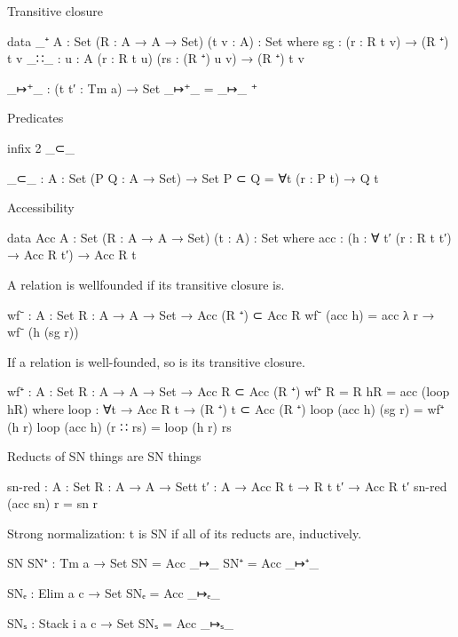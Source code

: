 Transitive closure


\begin{code}
data _⁺ {A : Set} (R : A → A → Set) (t v : A) : Set where
  sg   : (r : R t v) → (R ⁺) t v
  _∷_  : {u : A} (r : R t u) (rs : (R ⁺) u v) → (R ⁺) t v

_↦⁺_ : (t t′ : Tm a) → Set
_↦⁺_ = _↦_ ⁺
\end{code}


Predicates

\begin{code}
infix 2 _⊂_

_⊂_ : {A : Set} (P Q : A → Set) → Set
P ⊂ Q = ∀{t} (r : P t) → Q t
\end{code}

Accessibility

\begin{code}
data Acc {A : Set} (R : A → A → Set) (t : A) : Set where
  acc : (h : ∀ {t′} (r : R t t′) → Acc R t′) → Acc R t
\end{code}

A relation is wellfounded if its transitive closure is.

\begin{code}
wf⁻ : {A : Set} {R : A → A → Set} → Acc (R ⁺) ⊂ Acc R
wf⁻ (acc h) = acc λ r → wf⁻ (h (sg r))
\end{code}

If a relation is well-founded, so is its transitive closure.

\begin{code}
wf⁺ : {A : Set} {R : A → A → Set} → Acc R ⊂ Acc (R ⁺)
wf⁺ {R = R} hR = acc (loop hR)
  where
  loop : ∀{t} → Acc R t → (R ⁺) t ⊂ Acc (R ⁺)
  loop (acc h) (sg r)    = wf⁺ (h r)
  loop (acc h) (r ∷ rs)  = loop (h r) rs
\end{code}

Reducts of SN things are SN things

\begin{code}
sn-red : {A : Set} {R : A → A → Set}{t t′ : A} → Acc R t → R t t′ → Acc R t′
sn-red (acc sn) r = sn r
\end{code}

Strong normalization: t is SN if all of its reducts are, inductively.

\begin{code}
SN SN⁺ : Tm a → Set
SN   = Acc _↦_
SN⁺  = Acc _↦⁺_

SNₑ : Elim a c → Set
SNₑ = Acc _↦ₑ_

SNₛ : Stack i a c → Set
SNₛ = Acc _↦ₛ_
\end{code}

